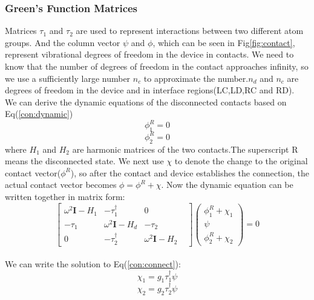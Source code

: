 \subsubsection*{Green's Function Matrices}
Matrices $\tau_1$ and $\tau_2$ are used to represent interactions between two different atom groups. And the column vector $\psi$ and $\phi$, which can be seen in Fig\ref{fig:contact}, represent vibrational degrees of freedom in the device in contacts. We need to know that the number of degrees of freedom in the contact approaches infinity, so we use a sufficiently large number $n_c$ to approximate the number.$n_d$ and $n_c$ are degrees of freedom in the device and in interface regions(LC,LD,RC and RD).\\
We can derive the dynamic equations of the disconnected contacts based on Eq(\ref{con:dynamic})
\begin{equation}
[\omega^2 \textbf{I} - \textbf{$H_1$}] \phi_1^R=0
\end{equation}
\begin{equation}
[\omega^2 \textbf{I} - \textbf{$H_2$}] \phi_2^R=0
\end{equation}
where $\textbf{$H_1$}$ and $\textbf{$H_2$}$ are harmonic matrices of the two contacts.The superscript R means the disconnected state. We next use $\chi$ to denote the change to the original contact vector($\phi^R$), so after the contact and device establishes the connection, the actual contact vector becomes $\phi=\phi^R + \chi$.
Now the dynamic equation can be written together in matrix form:
\begin{equation}
\left[
\begin{matrix}
\omega^2 \textbf{I} - \textbf{$H_1$}&-\tau_1^{\dag}&0&\\
-\tau_1&\omega^2 \textbf{I} - \textbf{$H_d$}&-\tau_2&\\
0&-\tau_2^{\dag}&\omega^2 \textbf{I} - \textbf{$H_2$}&
\end{matrix}
\right]
\left(
\begin{matrix}
\phi_1^R + \chi_1\\
\psi\\
\phi_2^R + \chi_2
\end{matrix}
\right) = 0 \label{con:connect} 
\end{equation}\\
We can write the solution to Eq(\ref{con:connect}):
\begin{equation}
\chi_1=g_1\tau_1^{\dag}\psi
\end{equation}
\begin{equation}
\chi_2=g_2\tau_2^{\dag}\psi
\end{equation}
